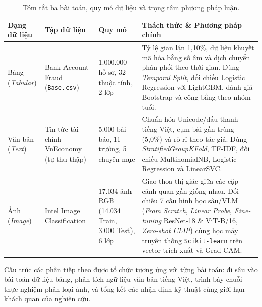 \begin{table}[H]
  \centering
  \caption{Tóm tắt ba bài toán, quy mô dữ liệu và trọng tâm phương pháp luận.}
  \label{tab:overview_datasets}
  \begin{tabularx}{\linewidth}{l p{3.1cm} p{3.1cm} X}
    \toprule
    \textbf{Dạng dữ liệu} & \textbf{Tập dữ liệu} & \textbf{Quy mô} & \textbf{Thách thức \& Phương pháp chính} \\
    \midrule
    Bảng (\textit{Tabular}) & Bank Account Fraud (\texttt{Base.csv}) \cite{jesus2022turning} & 1.000.000 hồ sơ, 32 thuộc tính, 2 lớp & Tỷ lệ gian lận 1,10\%, dữ liệu khuyết mã hóa bằng số âm và dịch chuyển phân phối theo thời gian. Dùng \textit{Temporal Split}, đối chiếu Logistic Regression với LightGBM, đánh giá Bootstrap và công bằng theo nhóm tuổi. \\
    Văn bản (\textit{Text}) & Tin tức tài chính VnEconomy (tự thu thập) & 5.000 bài báo, 11 trường, 5 chuyên mục & Chuẩn hóa Unicode/dấu thanh tiếng Việt, cụm bài gần trùng (5,0\%) và rò rỉ theo tác giả. Dùng \textit{StratifiedGroupKFold}, TF-IDF, đối chiếu MultinomialNB, Logistic Regression và LinearSVC. \\
    Ảnh (\textit{Image}) & Intel Image Classification \cite{bansal2019intel} & 17.034 ảnh RGB (14.034 Train, 3.000 Test), 6 lớp & Giao thoa thị giác giữa các cặp cảnh quan gần giống nhau. Đối chiếu 7 cấu hình học sâu/VLM (\textit{From Scratch}, \textit{Linear Probe}, \textit{Fine-tuning} ResNet-18 \& ViT-B/16, \textit{Zero-shot CLIP}) cùng học máy truyền thống \texttt{Scikit-learn} trên vector trích xuất và Grad-CAM. \\
    \bottomrule
  \end{tabularx}
\end{table}

Cấu trúc các phần tiếp theo được tổ chức tương ứng với từng bài toán:  đi sâu vào bài toán dữ liệu bảng,  phân tích ngữ liệu văn bản tiếng Việt,  trình bày chuỗi thực nghiệm phân loại ảnh, và  tổng kết các nhận định kỹ thuật cùng giới hạn khách quan của nghiên cứu.

